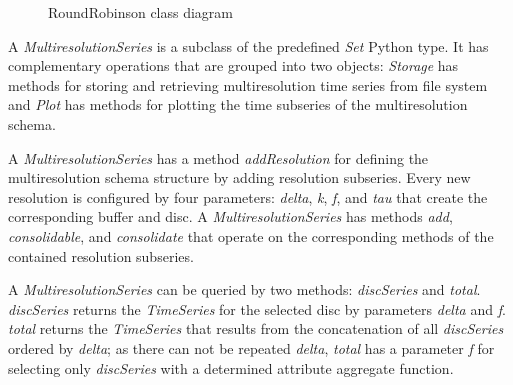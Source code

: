 \begin{figure}[tp]
  \centering


  \caption{RoundRobinson  class diagram}
  \label{fig:implementacio:roundrobinson-uml}
\end{figure}



A \emph{MultiresolutionSeries} is a subclass of the predefined \emph{Set} Python
type. It has complementary operations that are grouped into two
objects: \emph{Storage} has methods for storing and retrieving
multiresolution time series from file system and \emph{Plot} has
methods for plotting the time subseries of the multiresolution schema.


A \emph{MultiresolutionSeries} has a method \emph{addResolution} for defining
the multiresolution schema structure by adding resolution
subseries. Every new resolution is configured by four parameters:
\emph{delta}, \emph{k}, \emph{f}, and \emph{tau} that create the
corresponding buffer and disc.  A \emph{MultiresolutionSeries} has methods
\emph{add}, \emph{consolidable}, and \emph{consolidate} that operate on
the corresponding methods of the contained resolution subseries.


A \emph{MultiresolutionSeries} can be queried by two methods:
\emph{discSeries} and \emph{total}. \emph{discSeries} returns the
\emph{TimeSeries} for the selected disc by parameters \emph{delta} and
\emph{f}. \emph{total} returns the \emph{TimeSeries} that results from the
concatenation of all \emph{discSeries} ordered by \emph{delta}; as
there can not be repeated \emph{delta}, \emph{total} has a parameter
\emph{f} for selecting only \emph{discSeries} with a determined
attribute aggregate function.

